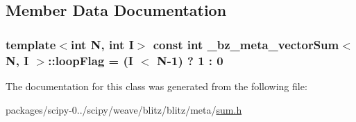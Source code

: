 \subsection{Member Data Documentation}
\hypertarget{class__bz__meta__vectorSum_a822c166dde65dd9e9ee0f57885bba308}{}
\subsubsection[{loop\+Flag}]{\setlength{\rightskip}{0pt plus 5cm}template$<$int N, int I$>$ const int {\bf \+\_\+bz\+\_\+meta\+\_\+vector\+Sum}$<$ {\bf N}, I $>$\+::loop\+Flag = (I $<$ {\bf N}-\/1) ? 1 \+: 0\hspace{0.3cm}{\ttfamily [static]}}\label{class__bz__meta__vectorSum_a822c166dde65dd9e9ee0f57885bba308}


The documentation for this class was generated from the following file\+:\begin{DoxyCompactItemize}
\item 
packages/scipy-\/0../scipy/weave/blitz/blitz/meta/\hyperlink{sum_8h}{sum.\+h}\end{DoxyCompactItemize}
